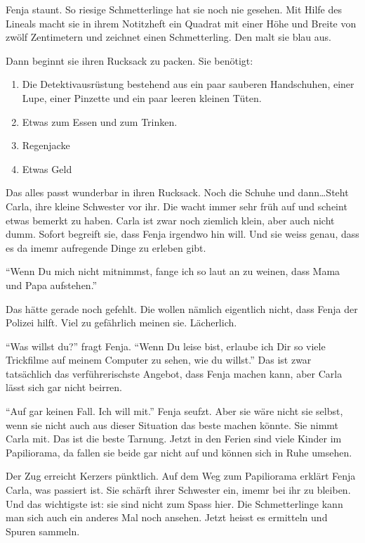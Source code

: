 Fenja staunt. So riesige Schmetterlinge hat sie noch nie gesehen. Mit Hilfe des Lineals macht sie in ihrem Notitzheft ein Quadrat mit einer Höhe und Breite von zwölf Zentimetern und zeichnet einen Schmetterling. Den malt sie blau aus. 

Dann beginnt sie ihren Rucksack zu packen. Sie benötigt:

\begin{enumerate}
  \item Die Detektivausrüstung bestehend aus ein paar sauberen Handschuhen, einer Lupe, einer Pinzette und ein paar leeren kleinen Tüten.
  \item Etwas zum Essen und zum Trinken.
  \item Regenjacke
  \item Etwas Geld
\end{enumerate}

Das alles passt wunderbar in ihren Rucksack. Noch die Schuhe und dann\dots Steht Carla, ihre kleine Schwester vor ihr. Die wacht immer sehr früh auf und scheint etwas bemerkt zu haben. Carla ist zwar noch ziemlich klein, aber auch nicht dumm. Sofort begreift sie, dass Fenja irgendwo hin will. Und sie weiss genau, dass es da imemr aufregende Dinge zu erleben gibt.

\enquote{Wenn Du mich nicht mitnimmst, fange ich so laut an zu weinen, dass Mama und Papa aufstehen.}

Das hätte gerade noch gefehlt. Die wollen nämlich eigentlich nicht, dass Fenja der Polizei hilft. Viel zu gefährlich meinen sie. Lächerlich. 

\enquote{Was willst du?} fragt Fenja. \enquote{Wenn Du leise bist, erlaube ich Dir so viele Trickfilme auf meinem Computer zu sehen, wie du willst.} Das ist zwar tatsächlich das verführerischste Angebot, dass Fenja machen kann, aber Carla lässt sich gar nicht beirren.

\enquote{Auf gar keinen Fall. Ich will mit.} Fenja seufzt. Aber sie wäre nicht sie selbst, wenn sie nicht auch aus dieser Situation das beste machen könnte. Sie nimmt Carla mit. Das ist die beste Tarnung. Jetzt in den Ferien sind viele Kinder im Papiliorama, da fallen sie beide gar nicht auf und können sich in Ruhe umsehen.

Der Zug erreicht Kerzers pünktlich. Auf dem Weg zum Papiliorama erklärt Fenja Carla, was passiert ist. Sie schärft ihrer Schwester ein, imemr bei ihr zu bleiben. Und das wichtigste ist: sie sind nicht zum Spass hier. Die Schmetterlinge kann man sich auch ein anderes Mal noch ansehen. Jetzt heisst es ermitteln und Spuren sammeln.

